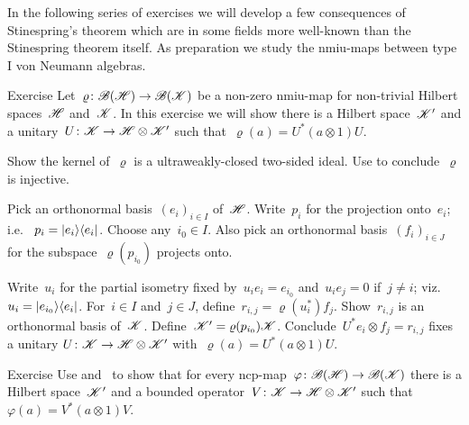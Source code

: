 \documentclass[b]{subfiles}
\begin{document}
\begin{parsec}%
\begin{point}%
In the following series of exercises we will develop
    a few consequences of Stinespring's theorem
    which are in some fields more well-known than
    the Stinespring theorem itself.
As preparation we study the nmiu-maps between type I von Neumann algebras.
\end{point}
\begin{point}{Exercise}%
Let~$\varrho\colon \mathscr{B}(\mathscr{H}) \to \mathscr{B}(\mathscr{K})$    
be a non-zero nmiu-map for non-trivial Hilbert spaces~$\mathscr{H}$ and~$\mathscr{K}$.
In this exercise we will show
    there is a Hilbert space~$\mathscr{K}'$
    and a unitary~$U\colon \mathscr{K} \to \mathscr{H} \otimes \mathscr{K}'$
    such that~$\varrho(a) = U^* (a\otimes 1) U $.

Show the kernel of~$\varrho$
    is a ultraweakly-closed two-sided ideal.
Use 
    to conclude~$\varrho$ is injective.

Pick an orthonormal basis~$(e_i)_{i\in I}$
    of~$\mathscr{H}$.
Write~$p_i$ for the projection onto~$e_i$;
i.e.~ $p_i = \ket{e_i}\!\bra{e_i}$.
Choose any~$i_0 \in I$.
Also pick an orthonormal basis~$(f_i)_{i \in J}$
    for the subspace~$\varrho(p_{i_0})$ projects onto.

Write~$u_i$
    for the partial isometry fixed by~$u_i e_i = e_{i_0}$
    and~$u_i e_j = 0$ if~$j \neq i$; viz.~$u_i = \ket{e_{i_0}}\!\bra{e_i}$.
For~$i\in I$ and~$j \in J$,
    define~$r_{i,j} = \varrho(u^*_i) f_j$.
Show~$r_{i,j}$ is an orthonormal basis of~$\mathscr{K}$.
Define~$\mathscr{K}' = \varrho(p_{i_0}) \mathscr{K}$.
Conclude~$U^* e_i \otimes f_j = r_{i,j}$
    fixes a unitary
    $U\colon \mathscr{K} \to \mathscr{H} \otimes \mathscr{K}'$
    with~$\varrho(a) = U^* (a\otimes 1) U $.
\end{point}
\begin{point}{Exercise}%
Use  and~ to show
    that for every ncp-map~$\varphi\colon \mathscr{B}(\mathscr{H}) \to \mathscr{B}(\mathscr{K})$
    there is a Hilbert space~$\mathscr{K}'$
    and a bounded operator~$V\colon \mathscr{K} \to \mathscr{H} \otimes \mathscr{K}'$
    such that~$\varphi(a) = V^* (a \otimes 1)V$.


\end{point}
\end{parsec}
\end{document}
